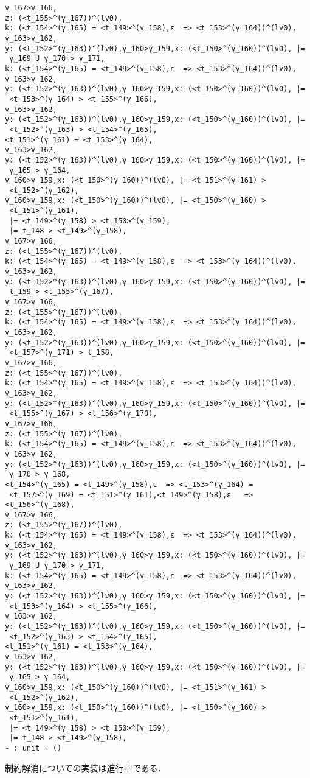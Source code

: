 \begin{lstlisting}
γ_167>γ_166,
z: (<t_155>^(γ_167))^(lv0),
k: (<t_154>^(γ_165) = <t_149>^(γ_158),ε  => <t_153>^(γ_164))^(lv0),
γ_163>γ_162,
y: (<t_152>^(γ_163))^(lv0),γ_160>γ_159,x: (<t_150>^(γ_160))^(lv0), |=
 γ_169 U γ_170 > γ_171,
k: (<t_154>^(γ_165) = <t_149>^(γ_158),ε  => <t_153>^(γ_164))^(lv0),
γ_163>γ_162,
y: (<t_152>^(γ_163))^(lv0),γ_160>γ_159,x: (<t_150>^(γ_160))^(lv0), |=
 <t_153>^(γ_164) > <t_155>^(γ_166),
γ_163>γ_162,
y: (<t_152>^(γ_163))^(lv0),γ_160>γ_159,x: (<t_150>^(γ_160))^(lv0), |=
 <t_152>^(γ_163) > <t_154>^(γ_165),
<t_151>^(γ_161) = <t_153>^(γ_164),
γ_163>γ_162,
y: (<t_152>^(γ_163))^(lv0),γ_160>γ_159,x: (<t_150>^(γ_160))^(lv0), |=
 γ_165 > γ_164,
γ_160>γ_159,x: (<t_150>^(γ_160))^(lv0), |= <t_151>^(γ_161) >
 <t_152>^(γ_162),
γ_160>γ_159,x: (<t_150>^(γ_160))^(lv0), |= <t_150>^(γ_160) >
 <t_151>^(γ_161),
 |= <t_149>^(γ_158) > <t_150>^(γ_159),
 |= t_148 > <t_149>^(γ_158),
γ_167>γ_166,
z: (<t_155>^(γ_167))^(lv0),
k: (<t_154>^(γ_165) = <t_149>^(γ_158),ε  => <t_153>^(γ_164))^(lv0),
γ_163>γ_162,
y: (<t_152>^(γ_163))^(lv0),γ_160>γ_159,x: (<t_150>^(γ_160))^(lv0), |=
 t_159 > <t_155>^(γ_167),
γ_167>γ_166,
z: (<t_155>^(γ_167))^(lv0),
k: (<t_154>^(γ_165) = <t_149>^(γ_158),ε  => <t_153>^(γ_164))^(lv0),
γ_163>γ_162,
y: (<t_152>^(γ_163))^(lv0),γ_160>γ_159,x: (<t_150>^(γ_160))^(lv0), |=
 <t_157>^(γ_171) > t_158,
γ_167>γ_166,
z: (<t_155>^(γ_167))^(lv0),
k: (<t_154>^(γ_165) = <t_149>^(γ_158),ε  => <t_153>^(γ_164))^(lv0),
γ_163>γ_162,
y: (<t_152>^(γ_163))^(lv0),γ_160>γ_159,x: (<t_150>^(γ_160))^(lv0), |=
 <t_155>^(γ_167) > <t_156>^(γ_170),
γ_167>γ_166,
z: (<t_155>^(γ_167))^(lv0),
k: (<t_154>^(γ_165) = <t_149>^(γ_158),ε  => <t_153>^(γ_164))^(lv0),
γ_163>γ_162,
y: (<t_152>^(γ_163))^(lv0),γ_160>γ_159,x: (<t_150>^(γ_160))^(lv0), |=
 γ_170 > γ_168,
<t_154>^(γ_165) = <t_149>^(γ_158),ε  => <t_153>^(γ_164) =
 <t_157>^(γ_169) = <t_151>^(γ_161),<t_149>^(γ_158),ε   => <t_156>^(γ_168),
γ_167>γ_166,
z: (<t_155>^(γ_167))^(lv0),
k: (<t_154>^(γ_165) = <t_149>^(γ_158),ε  => <t_153>^(γ_164))^(lv0),
γ_163>γ_162,
y: (<t_152>^(γ_163))^(lv0),γ_160>γ_159,x: (<t_150>^(γ_160))^(lv0), |=
 γ_169 U γ_170 > γ_171,
k: (<t_154>^(γ_165) = <t_149>^(γ_158),ε  => <t_153>^(γ_164))^(lv0),
γ_163>γ_162,
y: (<t_152>^(γ_163))^(lv0),γ_160>γ_159,x: (<t_150>^(γ_160))^(lv0), |=
 <t_153>^(γ_164) > <t_155>^(γ_166),
γ_163>γ_162,
y: (<t_152>^(γ_163))^(lv0),γ_160>γ_159,x: (<t_150>^(γ_160))^(lv0), |=
 <t_152>^(γ_163) > <t_154>^(γ_165),
<t_151>^(γ_161) = <t_153>^(γ_164),
γ_163>γ_162,
y: (<t_152>^(γ_163))^(lv0),γ_160>γ_159,x: (<t_150>^(γ_160))^(lv0), |=
 γ_165 > γ_164,
γ_160>γ_159,x: (<t_150>^(γ_160))^(lv0), |= <t_151>^(γ_161) >
 <t_152>^(γ_162),
γ_160>γ_159,x: (<t_150>^(γ_160))^(lv0), |= <t_150>^(γ_160) >
 <t_151>^(γ_161),
 |= <t_149>^(γ_158) > <t_150>^(γ_159),
 |= t_148 > <t_149>^(γ_158),
- : unit = ()
\end{lstlisting}
\normalsize

制約解消についての実装は進行中である．
